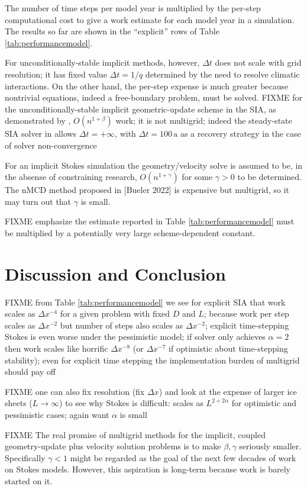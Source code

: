 \documentclass[twocolumn,letterpaper]{igs}
\begin{document}
The number of time steps per model year is multiplied by the per-step computational cost to give a work estimate for each model year in a simulation.  The results so far are shown in the ``explicit'' rows of Table \ref{tab:performancemodel}.

For unconditionally-stable implicit methods, however, $\Delta t$ does not scale with grid resolution; it has fixed value $\Delta t = 1/q$ determined by the need to resolve climatic interactions.  On the other hand, the per-step expense is much greater because nontrivial equations, indeed a free-boundary problem, must be solved.  FIXME for the unconditionally-stable implicit geometric-update scheme in the SIA, as demonstrated by \cite{Bueler2016}, $O(n^{1+\beta})$ work; it is not multigrid; indeed the steady-state SIA solver in \cite{Bueler2016} allows $\Delta t=+\infty$, with $\Delta t = 100 \,\text{a}$ as a recovery strategy in the case of solver non-convergence

For an implicit Stokes simulation the geometry/velocity solve is assumed to be, in the absense of constraining research, $O(n^{1+\gamma})$ for some $\gamma>0$ to be determined.  The nMCD method proposed in [Bueler 2022] is expensive but multigrid, so it may turn out that $\gamma$ is small.

FIXME emphasize the estimate reported in Table \ref{tab:performancemodel} must be multiplied by a potentially very large scheme-dependent constant.


\section{Discussion and Conclusion}

FIXME from Table \ref{tab:performancemodel} we see for explicit SIA that work scales as $\Delta x^{-4}$ for a given problem with fixed $D$ and $L$; because work per step scales as $\Delta x^{-2}$ but number of steps also scales as $\Delta x^{-2}$; explicit time-stepping Stokes is even worse under the pessimistic model; if solver only achieves $\alpha=2$ then work scales like horrific $\Delta x^{-8}$ (or $\Delta x^{-7}$ if optimistic about time-stepping stability); even for explicit time stepping the implementation burden of multigrid should pay off

FIXME one can also fix resolution (fix $\Delta x$) and look at the expense of larger ice sheets ($L\to \infty$) to see why Stokes is difficult: scales as $L^{2+2\alpha}$ for optimistic and pessimistic cases; again want $\alpha$ is small

FIXME The real promise of multigrid methods for the implicit, coupled geometry-update plus velocity solution problems is to make $\beta,\gamma$ seriously smaller.  Specifically $\gamma < 1$ might be regarded as the goal of the next few decades of work on Stokes models.  However, this aspiration is long-term because work is barely started on it.



\end{document}

